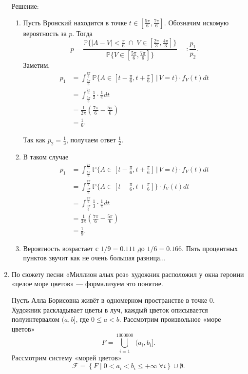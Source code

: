 \documentclass[12pt]{article}
\begin{document}
\begin{enumerate}[resume]
Решение: 
\begin{enumerate}
   \item Пусть Вронский находится в точке $t\in[\frac{5\pi}{6}, \frac{7\pi}{6}]$. 
   Обозначим искомую вероятность за $p$.
   Тогда
   \[
   p=\frac{\mathbb P\{|A-V|<\frac{\pi}{6}\;\cap\;V\in[\frac{2\pi}{3}, \frac{4\pi}{3}]\}}{\mathbb P\{V\in[\frac{5\pi}{6}, \frac{7\pi}{6}]\}}=:\frac{p_1}{p_2}.
   \]
   Заметим,
   \begin{align*}
       p_1&=\int_{\frac{5\pi}{6}}^{\frac{7\pi}{6}}\mathbb P\{A\in[t-\frac{\pi}{6}, t+\frac{\pi}{6}]\,|\,V=t\} \cdot f_V(t) dt\\
       &=\int_{\frac{5\pi}{6}}^{\frac{7\pi}{6}}\frac{1}{2}\cdot \frac{1}{\pi}dt\\
       &=\frac{1}{2\pi}\left(\frac{7\pi}{6}-\frac{5\pi}{6}\right)\\
       &=\frac{1}{6}.
   \end{align*}
    
   Так как $p_2=\frac{1}{3}$, получаем ответ $\frac{1}{2}$.

   \item В таком случае
   \begin{align*}
       p_1&=\int_{\frac{5\pi}{6}}^{\frac{7\pi}{6}}\mathbb P\{A\in[t-\frac{\pi}{6}, t+\frac{\pi}{6}]\,|\,V=t\} \cdot f_V(t) dt\\
       &=\int_{\frac{5\pi}{6}}^{\frac{7\pi}{6}}\mathbb P\{A\in[t-\frac{\pi}{6}, t+\frac{\pi}{6}]\} \cdot f_V(t) dt\\
       &=\int_{\frac{5\pi}{6}}^{\frac{7\pi}{6}}\frac{1}{3}\cdot \frac{1}{\pi}dt\\
       &=\frac{1}{3\pi}\left(\frac{7\pi}{6}-\frac{5\pi}{6}\right)\\
       &=\frac{1}{9}.
   \end{align*}

   \item Вероятность возрастает с $1/9=0.111$ до $1/6=0.166$. 
   Пять процентных пунктов звучит как не очень большая разница...
\end{enumerate}

\item По сюжету песни «Миллион алых роз» художник расположил у окна героини «целое море цветов» — формализуем это понятие.

Пусть Алла Борисовна живёт в одномерном пространстве в точке $0$. 
Художник раскладывает цветы в луч, каждый цветок описывается полуинтервалом $(a, b]$, где $0\le a< b$. 
Рассмотрим произвольное «море цветов» 
\[
    F=\bigcup_{i=1}^{1000000} \,(a_i, b_i].
\]
Рассмотрим систему «морей цветов»
\[
    \mathcal{F}=\left\{F\;\bigg\rvert\;0<a_i<b_i\le+\infty\;\forall i\right\}\cup\emptyset.
\]


\end{enumerate}
\end{document}
